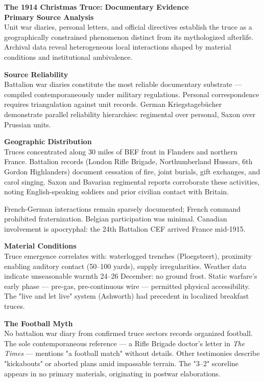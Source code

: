 \begin{technical}
{\Large\textbf{The 1914 Christmas Truce: Documentary Evidence}}\\[0.7em]

\noindent\textbf{Primary Source Analysis}\\[0.5em]
Unit war diaries, personal letters, and official directives establish the truce as a geographically constrained phenomenon distinct from its mythologized afterlife. Archival data reveal heterogeneous local interactions shaped by material conditions and institutional ambivalence.

\noindent\textbf{Source Reliability}\\[0.5em]
Battalion war diaries constitute the most reliable documentary substrate — compiled contemporaneously under military regulations. Personal correspondence requires triangulation against unit records. German Kriegstagebücher demonstrate parallel reliability hierarchies: regimental over personal, Saxon over Prussian units.

\noindent\textbf{Geographic Distribution}\\[0.5em]
Truces concentrated along 30 miles of BEF front in Flanders and northern France. Battalion records (London Rifle Brigade, Northumberland Hussars, 6th Gordon Highlanders) document cessation of fire, joint burials, gift exchanges, and carol singing. Saxon and Bavarian regimental reports corroborate these activities, noting English-speaking soldiers and prior civilian contact with Britain.

French-German interactions remain sparsely documented; French command prohibited fraternization. Belgian participation was minimal. Canadian involvement is apocryphal: the 24th Battalion CEF arrived France mid-1915.

\noindent\textbf{Material Conditions}\\[0.5em]
Truce emergence correlates with: waterlogged trenches (Ploegsteert), proximity enabling auditory contact (50–100 yards), supply irregularities. Weather data indicate unseasonable warmth 24–26 December: no ground frost. Static warfare's early phase — pre-gas, pre-continuous wire — permitted physical accessibility. The "live and let live" system (Ashworth) had precedent in localized breakfast truces.

\noindent\textbf{The Football Myth}\\[0.5em]
No battalion war diary from confirmed truce sectors records organized football. The sole contemporaneous reference — a Rifle Brigade doctor's letter in \textit{The Times} — mentions "a football match" without details. Other testimonies describe "kickabouts" or aborted plans amid impassable terrain. The "3–2" scoreline appears in no primary materials, originating in postwar elaborations. 


\end{technical}
